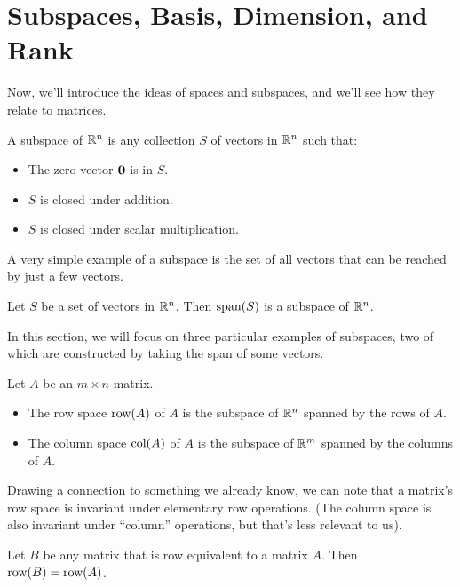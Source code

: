 \documentclass[../m073main.tex]{subfiles}
\begin{document}
\section{Subspaces, Basis, Dimension, and Rank}
Now, we'll introduce the ideas of spaces and subspaces, and we'll see how they relate to matrices.

\begin{definition}[Subspace]
	A subspace of $\mathbb{R}^n$ is any collection $S$ of vectors in $\mathbb{R}^n$ such that:
	\begin{itemize}
		\item The zero vector $\mathbf{0}$ is in $S$.
		\item $S$ is closed under addition.
		\item $S$ is closed under scalar multiplication.
	\end{itemize}
\end{definition}

A very simple example of a subspace is the set of all vectors that can be reached by just a few vectors.

\begin{theorem}
	Let $S$ be a set of vectors in $\mathbb{R}^n$.
	Then $\textrm{span}(S)$ is a subspace of $\mathbb{R}^n$.
\end{theorem}

In this section, we will focus on three particular examples of subspaces, two of which are constructed by taking the span of some vectors.

\begin{definition}
	Let $A$ be an $m\times n$ matrix.
	\begin{itemize}
		\item The row space $\textrm{row}(A)$ of $A$ is the subspace of $\mathbb{R}^n$ spanned by the rows of $A$.
		\item The column space $\textrm{col}(A)$ of $A$ is the subspace of $\mathbb{R}^m$ spanned by the columns of $A$.
	\end{itemize}
\end{definition}

Drawing a connection to something we already know, we can note that a matrix's row space is invariant under elementary row operations.
(The column space is also invariant under ``column'' operations, but that's less relevant to us).

\begin{theorem}
	Let $B$ be any matrix that is row equivalent to a matrix $A$.
	Then $\textrm{row}(B) = \textrm{row}(A)$.
\end{theorem}
\end{document}
